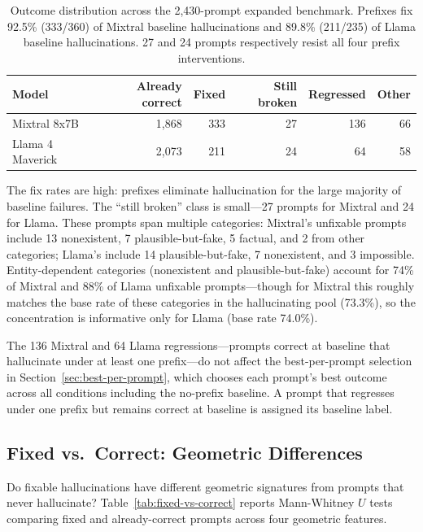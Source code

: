 \begin{table}[ht]
\centering
\small
\begin{tabular}{@{}lrrrrr@{}}
\toprule
\textbf{Model} & \textbf{Already correct} & \textbf{Fixed} & \textbf{Still broken} & \textbf{Regressed} & \textbf{Other} \\
\midrule
Mixtral 8x7B & 1{,}868 & 333 & 27 & 136 & 66 \\
Llama 4 Maverick & 2{,}073 & 211 & 24 & 64 & 58 \\
\bottomrule
\end{tabular}
\caption{Outcome distribution across the 2,430-prompt expanded benchmark. Prefixes fix 92.5\% (333/360) of Mixtral baseline hallucinations and 89.8\% (211/235) of Llama baseline hallucinations. 27 and 24 prompts respectively resist all four prefix interventions.}
\label{tab:outcome-distribution}
\end{table}

The fix rates are high: prefixes eliminate hallucination for the large majority of baseline failures. The ``still broken'' class is small---27 prompts for Mixtral and 24 for Llama. These prompts span multiple categories: Mixtral's unfixable prompts include 13 nonexistent, 7 plausible-but-fake, 5 factual, and 2 from other categories; Llama's include 14 plausible-but-fake, 7 nonexistent, and 3 impossible. Entity-dependent categories (nonexistent and plausible-but-fake) account for 74\% of Mixtral and 88\% of Llama unfixable prompts---though for Mixtral this roughly matches the base rate of these categories in the hallucinating pool (73.3\%), so the concentration is informative only for Llama (base rate 74.0\%).

The 136 Mixtral and 64 Llama regressions---prompts correct at baseline that hallucinate under at least one prefix---do not affect the best-per-prompt selection in Section~\ref{sec:best-per-prompt}, which chooses each prompt's best outcome across all conditions including the no-prefix baseline. A prompt that regresses under one prefix but remains correct at baseline is assigned its baseline label.

\subsection{Fixed vs.\ Correct: Geometric Differences}
\label{sec:fixed-vs-correct}

Do fixable hallucinations have different geometric signatures from prompts that never hallucinate? Table~\ref{tab:fixed-vs-correct} reports Mann-Whitney $U$ tests comparing fixed and already-correct prompts across four geometric features.

